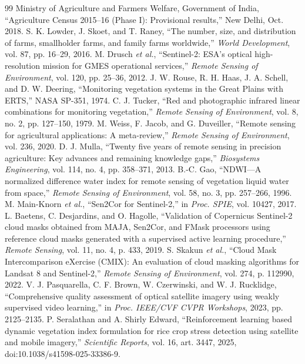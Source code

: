 \documentclass[conference]{IEEEtran}
\begin{document}
\begin{thebibliography}{99}
 Ministry of Agriculture and Farmers Welfare, Government of India, ``Agriculture Census 2015--16 (Phase I): Provisional results,'' New Delhi, Oct. 2018.
 S. K. Lowder, J. Skoet, and T. Raney, ``The number, size, and distribution of farms, smallholder farms, and family farms worldwide,'' \emph{World Development}, vol. 87, pp. 16--29, 2016.
 M. Drusch \emph{et al.}, ``Sentinel-2: ESA's optical high-resolution mission for GMES operational services,'' \emph{Remote Sensing of Environment}, vol. 120, pp. 25--36, 2012.
 J. W. Rouse, R. H. Haas, J. A. Schell, and D. W. Deering, ``Monitoring vegetation systems in the Great Plains with ERTS,'' NASA SP-351, 1974.
 C. J. Tucker, ``Red and photographic infrared linear combinations for monitoring vegetation,'' \emph{Remote Sensing of Environment}, vol. 8, no. 2, pp. 127--150, 1979.
 M. Weiss, F. Jacob, and G. Duveiller, ``Remote sensing for agricultural applications: A meta-review,'' \emph{Remote Sensing of Environment}, vol. 236, 2020.
 D. J. Mulla, ``Twenty five years of remote sensing in precision agriculture: Key advances and remaining knowledge gaps,'' \emph{Biosystems Engineering}, vol. 114, no. 4, pp. 358--371, 2013.
 B.-C. Gao, ``NDWI---A normalized difference water index for remote sensing of vegetation liquid water from space,'' \emph{Remote Sensing of Environment}, vol. 58, no. 3, pp. 257--266, 1996.
 M. Main-Knorn \emph{et al.}, ``Sen2Cor for Sentinel-2,'' in \emph{Proc. SPIE}, vol. 10427, 2017.
 L. Baetens, C. Desjardins, and O. Hagolle, ``Validation of Copernicus Sentinel-2 cloud masks obtained from MAJA, Sen2Cor, and FMask processors using reference cloud masks generated with a supervised active learning procedure,'' \emph{Remote Sensing}, vol. 11, no. 4, p. 433, 2019.
 S. Skakun \emph{et al.}, ``Cloud Mask Intercomparison eXercise (CMIX): An evaluation of cloud masking algorithms for Landsat 8 and Sentinel-2,'' \emph{Remote Sensing of Environment}, vol. 274, p. 112990, 2022.
 V. J. Pasquarella, C. F. Brown, W. Czerwinski, and W. J. Rucklidge, ``Comprehensive quality assessment of optical satellite imagery using weakly supervised video learning,'' in \emph{Proc. IEEE/CVF CVPR Workshops}, 2023, pp. 2125--2135.
 P. Seralathan and A. Shirly Edward, ``Reinforcement learning based dynamic vegetation index formulation for rice crop stress detection using satellite and mobile imagery,'' \emph{Scientific Reports}, vol. 16, art. 3447, 2025, doi:10.1038/s41598-025-33386-9.

\end{thebibliography}
\end{document}
